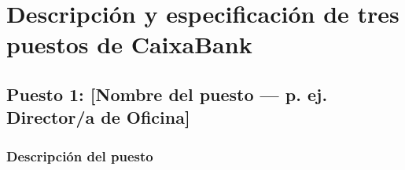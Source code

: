 %
%
%
%

\section{Descripción y especificación de tres puestos de CaixaBank}


\subsection{Puesto 1: [Nombre del puesto — p. ej. Director/a de Oficina]}

\subsubsection{Descripción del puesto}

